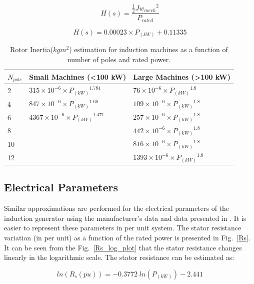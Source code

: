 \documentclass[twocolumn]{article}
\begin{document}
\begin{equation}
	H(s)=\frac{\frac{1}{2} J {w_{mech}}^2}{P_{rated}}
	\label{eq:time_constant}
\end{equation}

\begin{equation}
	H(s)=0.00023 \times P_{(kW)} + 0.11335
	\label{eq:time_constant_trend}
\end{equation}

\begin{table}
  \centering
  \begin{tabular}{lll}
   $N_{pole}$ & Small Machines (<100 kW) & Large Machines (>100 kW) \\
  \hline
2 & $315\times10^{-6}\times {P_{(kW)}}^{1.784}$ & $76\times10^{-6}\times {P_{(kW)}}^{1.8}$ \\
4 & $847\times10^{-6}\times {P_{(kW)}}^{1.68}$ & $109\times10^{-6}\times {P_{(kW)}}^{1.8}$ \\
6 & $4367\times10^{-6}\times {P_{(kW)}}^{1.471}$ & $257\times10^{-6}\times {P_{(kW)}}^{1.8}$ \\
8 &  & $442\times10^{-6}\times {P_{(kW)}}^{1.8}$ \\
10 & & $816\times10^{-6}\times {P_{(kW)}}^{1.8}$ \\
12 & & $1393\times10^{-6}\times {P_{(kW)}}^{1.8}$ \\
\hline
  \end{tabular}
  \caption{Rotor Inertia($kg m^2$) estimation for induction machines as a function of number of poles and rated power.}
  \label{inertia_estimation}
\end{table}


\subsection*{Electrical Parameters} %
\label{sub:electrical_parameters}

Similar approximations are performed for the electrical parameters of the induction generator using the manufacturer's data and data presented in \cite{Thiringer2001}.
It is easier to represent these parameters in per unit system. The stator resistance variation (in per unit) as a function of the rated power is presented in Fig.~\ref{Rs}. It can be seen from the Fig.~\ref{Rs_log_plot} that the stator resistance changes linearly in the logarithmic scale. The stator resistance can be estimated as:

\begin{equation}
 	ln(R_s(pu))=-0.3772\;ln (P_{(kW)}) - 2.441
 	\label{eq:Rs}
 \end{equation} 
\end{document}
